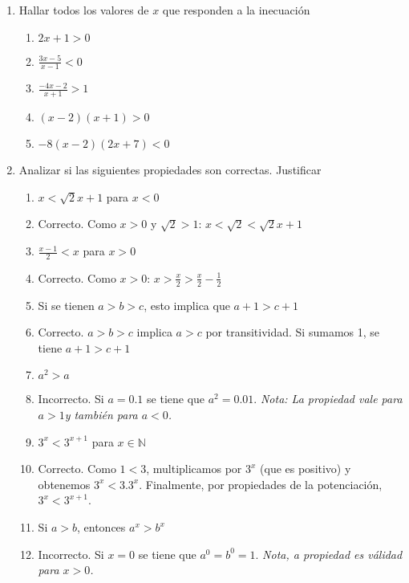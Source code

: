 \documentclass[a4paper]{article}
\newcommand{\answer}{\item[**]}
\newcommand{\exercise}{\item}
\begin{document}
\begin{enumerate}
	\exercise Hallar todos los valores de $x$ que responden a la inecuación
	\begin{enumerate} [label=(\alph*)]
		\item $2x+1>0$

		\item $\displaystyle\frac{3x-5}{x-1}<0$

		\item $\displaystyle\frac{-4x-2}{x+1}>1$

		\item $(x-2)(x+1)>0$

		\item $-8(x-2)(2x+7)<0$
	
	\end{enumerate}


	\exercise Analizar si las siguientes propiedades son correctas. Justificar
	\begin{multicols}{2}
	\begin{enumerate} [label=(\alph*)]
		\item $x < \sqrt{2} x +1$ para $x<0$
		\answer Correcto. Como $x>0$ y $\sqrt{2}>1$: $x < \sqrt{2} < \sqrt{2} x +1$
		
		\item $\displaystyle\frac{x-1}{2} < x$ para $x>0$
		\answer Correcto. Como $x>0$: $x > \displaystyle\frac{x}{2} > \displaystyle\frac{x}{2}-\displaystyle\frac{1}{2}$ 

		\item Si se tienen $a>b>c$, esto implica que $a+1>c+1$
		\answer	Correcto. $a>b>c$ implica $a>c$ por transitividad. Si sumamos 1, se tiene $a+1>c+1$

		\item $a^2 > a$
		\answer Incorrecto. Si $a=0.1$ se tiene que $a^2=0.01$. \textit{Nota: La propiedad vale para $a>1$y también para $a<0$.}

		\item $3^{x} < 3^{x+1}$ para $x \in \mathbb{N}$
		\answer Correcto. Como $1 < 3$, multiplicamos por $3^{x}$ (que es positivo) y obtenemos $3^{x} < 3.3^{x}$. Finalmente, por propiedades de la potenciación, $3^{x} < 3^{x+1}$.

		\item Si $a>b$, entonces $a^x > b^x$
		\answer Incorrecto. Si $x=0$ se tiene que $a^0=b^0=1$. \textit{Nota, a propiedad es válidad para $x>0$.}

	\end{enumerate}
	\end{multicols}


\end{enumerate}
\end{document}

